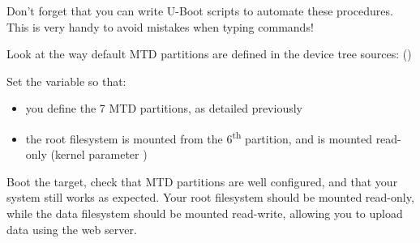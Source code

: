 Don't forget that you can write U-Boot scripts to automate these
procedures. This is very handy to avoid mistakes when typing commands!

Look at the way default MTD partitions are defined in the device tree
sources: ()

Set the  variable so that:

\begin{itemize}
\item you define the 7 MTD partitions, as detailed previously
\item the root filesystem is mounted from the 6\textsuperscript{th}
  partition, and is mounted read-only (kernel parameter )
\end{itemize}

Boot the target, check that MTD partitions are well configured, and
that your system still works as expected. Your root filesystem should
be mounted read-only, while the data filesystem should be mounted
read-write, allowing you to upload data using the web server.
